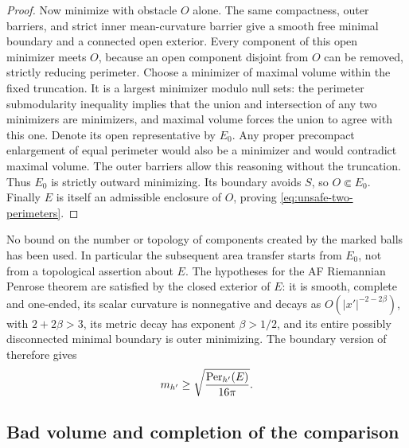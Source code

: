 \begin{proof}
Now minimize with obstacle \(O\) alone.  The same compactness,
outer barriers, and strict inner mean-curvature barrier give
a smooth free minimal boundary and a connected open exterior.
Every component of this open minimizer meets \(O\), because
an open component disjoint from \(O\) can be removed, strictly
reducing perimeter.  Choose a minimizer of maximal volume within
the fixed truncation.  It is a largest minimizer modulo null
sets: the perimeter submodularity inequality implies that the
union and intersection of any two minimizers are minimizers,
and maximal volume forces the union to agree with this one.
Denote its open representative by \(E_0\).  Any proper
precompact enlargement of equal perimeter would also be a
minimizer and would contradict maximal volume.  The outer
barriers allow this reasoning without the truncation.  Thus
\(E_0\) is strictly outward minimizing.  Its boundary avoids
\(S\), so \(O\Subset E_0\).  Finally \(E\) is itself an
admissible enclosure of \(O\), proving
\eqref{eq:unsafe-two-perimeters}.
\end{proof}

No bound on the number or topology of components created by the
marked balls has been used.  In particular the subsequent area
transfer starts from \(E_0\), not from a topological assertion
about \(E\).  The hypotheses for the AF Riemannian Penrose theorem
are satisfied by the closed exterior of \(E\): it is smooth,
complete and one-ended, its scalar curvature is nonnegative and
decays as \(O(|x'|^{-2-2\beta})\), with \(2+2\beta>3\),
its metric decay has exponent \(\beta>1/2\),
and its entire possibly disconnected minimal boundary is outer
minimizing.  The boundary version of \citet[Theorem~1.4]{BrayLee2009}
therefore gives
\begin{equation}
 m_{h'}\ge\sqrt{\frac{\operatorname{Per}_{h'}(E)}{16\pi}}.
 \label{eq:unsafe-af-penrose}
\end{equation}

\subsection{Bad volume and completion of the comparison}


